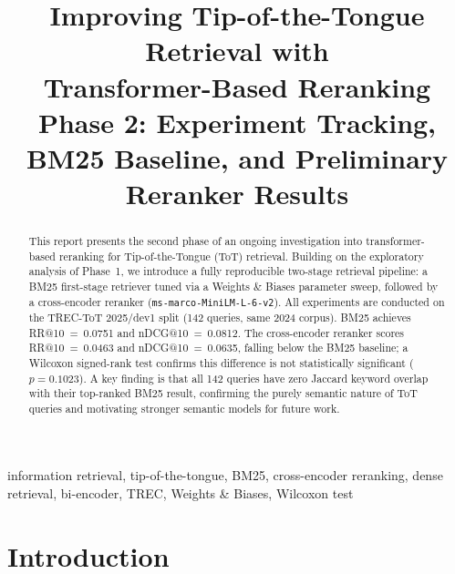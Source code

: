 \documentclass[conference]{IEEEtran}
\begin{document}
\title{Improving Tip-of-the-Tongue Retrieval with\\Transformer-Based Reranking\\
{\large Phase 2: Experiment Tracking, BM25 Baseline, and Preliminary Reranker Results}}

\author{
}

\maketitle

\begin{abstract}
This report presents the second phase of an ongoing investigation into
transformer-based reranking for Tip-of-the-Tongue (ToT) retrieval.
Building on the exploratory analysis of Phase~1, we introduce a fully
reproducible two-stage retrieval pipeline:
a BM25 first-stage retriever tuned via a Weights \& Biases parameter sweep,
followed by a cross-encoder reranker (\texttt{ms-marco-MiniLM-L-6-v2}).
All experiments are conducted on the TREC-ToT 2025/dev1 split (142 queries,
same 2024 corpus).
BM25 achieves RR@10~=~0.0751 and nDCG@10~=~0.0812.
The cross-encoder reranker scores RR@10~=~0.0463 and nDCG@10~=~0.0635,
falling below the BM25 baseline; a Wilcoxon signed-rank test confirms
this difference is not statistically significant ($p = 0.1023$).
A key finding is that all 142 queries have zero Jaccard keyword overlap
with their top-ranked BM25 result, confirming the purely semantic nature
of ToT queries and motivating stronger semantic models for future work.
\end{abstract}

\begin{IEEEkeywords}
information retrieval, tip-of-the-tongue, BM25, cross-encoder reranking,
dense retrieval, bi-encoder, TREC, Weights \& Biases, Wilcoxon test
\end{IEEEkeywords}

\section{Introduction}
\end{document}
